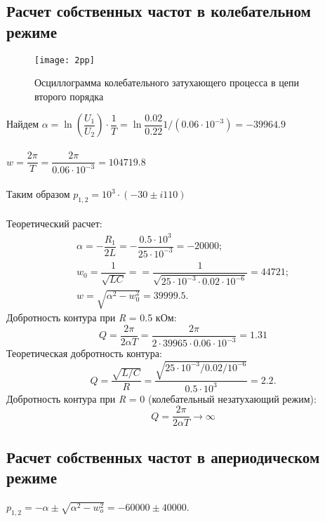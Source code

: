 \documentclass[a4paper,14pt ]{article} %
\begin{document}
\subsection{Расчет собственных частот в колебательном режиме} 
\begin{figure}[H]
    \centering
    \texttt{[image: 2pp]}
    \caption{\centering Осциллограмма колебательного затухающего процесса в цепи второго порядка}
\end{figure}
Найдем $\alpha = \ln\left(\dfrac{U_1}{U_2}\right)\cdot\dfrac1T = \ln\dfrac{0.02}{0.22}
1/(0.06\cdot10^{-3}) = -39964.9
$
\\\\
 $w = \dfrac{2\pi}{T} = \dfrac{2\pi}{0.06\cdot10^{-3}} = 104719.8$
\\\\
\indent Таким образом $p_{1,2} = 10^3\cdot(-30 \pm i110)$
\\\\ 
\indent Теоретический расчет: 
\begin{multline*}
    \alpha = -\dfrac{R_1}{2L} 
= -\dfrac{0.5\cdot10^3}{25\cdot10^{-3}} = -20000;\\ 
w_0 =\dfrac1{\sqrt{LC}} = 
= \dfrac{1}{\sqrt{25\cdot10^{-3}\cdot0.02\cdot10^{-6}}} =  44721; \\w = 
\sqrt{\alpha^2 - w_0^2} = 39999.5. 
\end{multline*}
\indent Добротность контура при {\it R} = 0.5 кОм:
\begin{equation*}
    Q=\frac{2\pi}{2\alpha T} = \frac{2\pi}{2\cdot39965\cdot 0.06 \cdot 10^{-3}}=
    1.31
\end{equation*}
\indent Теоретическая добротность контура: 
\begin{equation*}
    Q = \frac{\sqrt{L/C}}{R} = \dfrac{\sqrt{25\cdot10^{-3}/0.02/10^{-6}}}{0.5\cdot10^3} = 2.2.
\end{equation*}
\indent Добротность контура при {\it R} = 0 (колебательный незатухающий режим):
\begin{equation*}
    Q = \frac{2\pi}{2\alpha T} \to \infty
\end{equation*}
\subsection{Расчет собственных частот в апериодическом режиме}
$p_{1,2} = -\alpha \pm \sqrt{\alpha^2 - w_o^2} = -60000 \pm 40000$. 
\end{document}
